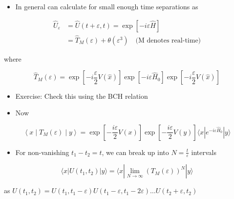 \begin{itemize}
  \item In general can calculate for small enough time separations as
\end{itemize}

\begin{equation}
\begin{aligned}
\hat U_{\varepsilon} & =\hat U(t+\varepsilon, t)=\exp [-i \varepsilon \hat{H}] \\
& =\hat T_{M}(\varepsilon)+\theta\left(\varepsilon^{3}\right) \quad \text{(M denotes real-time)}
\end{aligned}
\end{equation}

where

\begin{equation}
\hat T_{M}(\varepsilon)=\exp \left[-i \frac{\varepsilon}{2} V(\hat{x})\right] \exp \left[-i \varepsilon \hat H_{0}\right] \exp \left[-i\frac{ \varepsilon}{2} V(\hat{x})\right]
\end{equation}

\begin{itemize}
  \item Exercise: Check this using the BCH relation
\end{itemize}

\begin{itemize}
\item Now
\end{itemize}

\begin{equation}
\left\langle x \mid T_{M}(\varepsilon) \mid y\right\rangle=\exp \left[-\frac{i \varepsilon}{2} V(x)\right] \exp \left[-\frac{i\varepsilon}{2} V(y)\right]\langle x| e^{-i \varepsilon \hat H_{0}}|y\rangle
\end{equation}

\begin{itemize}
  \item For non-vanishing \(t_{1}-t_{2}=t\), we can break up into \(N=\frac{t}{\varepsilon}\) intervals
\end{itemize}

\begin{equation}
\langle x| U\left(t_{1}, t_{2}\right)|y\rangle=\langle x| \lim _{N \rightarrow \infty}\left(T_{M}(\varepsilon)\right)^{N}|y\rangle
\end{equation}

as \(U\left(t_{1}, t_{2}\right)=U\left(t_{1}, t_{1}-\varepsilon\right) U\left(t_{1}-\varepsilon, t_{1}-2 \varepsilon\right) \ldots U\left(t_{2}+\varepsilon, t_{2}\right)\)\\

